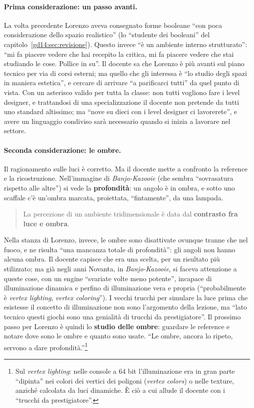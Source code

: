 \paragraph{Prima considerazione: un passo avanti.} La volta precedente Lorenzo aveva
consegnato forme booleane ``con poca considerazione dello spazio realistico'' (lo
``studente dei booleani'' del capitolo~\ref{gd14:sec:revisione}). Questo invece ``è un
ambiente interno strutturato'': ``mi fa piacere vedere che hai recepito la critica,
mi fa piacere vedere che stai studiando le cose. Pollice in su''. Il docente sa che
Lorenzo è più avanti sul piano tecnico per via di corsi esterni; ma quello che gli
interessa è ``lo studio degli spazi in maniera estetica'', e cercare di arrivare
``a parificarci tutti'' da quel punto di vista. Con un asterisco valido per tutta la
classe: non tutti vogliono fare i level designer, e trattandosi di una
specializzazione il docente non pretende da tutti uno standard altissimo; ma ``nove su
dieci con i level designer ci lavorerete'', e avere un linguaggio condiviso sarà
necessario quando si inizia a lavorare nel settore.

\paragraph{Seconda considerazione: le ombre.} Il ragionamento sulle luci è corretto.
Ma il docente mette a confronto la reference e la ricostruzione. Nell'immagine di
\emph{Banjo-Kazooie} (che sembra ``sovrasatura rispetto alle altre'') si vede la
\textbf{profondità}: un angolo è in ombra, e sotto uno scaffale c'è un'ombra marcata,
proiettata, ``fintamente'', da una lampada.
\begin{quote}
La percezione di un ambiente tridimensionale è data dal \textbf{contrasto fra luce e
ombra}.
\end{quote}
Nella stanza di Lorenzo, invece, le ombre sono disattivate ovunque tranne che nel
fuoco, e ne risulta ``una mancanza totale di profondità'': gli angoli non hanno alcuna
ombra. Il docente capisce che era una scelta, per un risultato più stilizzato; ma già
negli anni Novanta, in \emph{Banjo-Kazooie}, si faceva attenzione a queste cose, con un
engine ``svariate volte meno potente'', incapace di illuminazione dinamica e perfino di
illuminazione vera e propria (``probabilmente è \emph{vertex lighting},
\emph{vertex coloring}''). I vecchi trucchi per simulare la luce prima che esistesse il
concetto di illuminazione non sono l'argomento della lezione, ma ``lato tecnico questi
giochi sono una genialità di trucchi da prestigiatore''. Il prossimo passo per Lorenzo
è quindi lo \textbf{studio delle ombre}: guardare le reference e notare dove sono le
ombre e quanto sono usate. ``Le ombre, ancora lo ripeto, servono a dare
profondità.''\footnote{Sul \emph{vertex lighting}: nelle console a 64 bit
l'illuminazione era in gran parte ``dipinta'' nei colori dei vertici dei poligoni
(\emph{vertex colors}) o nelle texture, anziché calcolata da luci dinamiche. È ciò a
cui allude il docente con i ``trucchi da prestigiatore''.}

